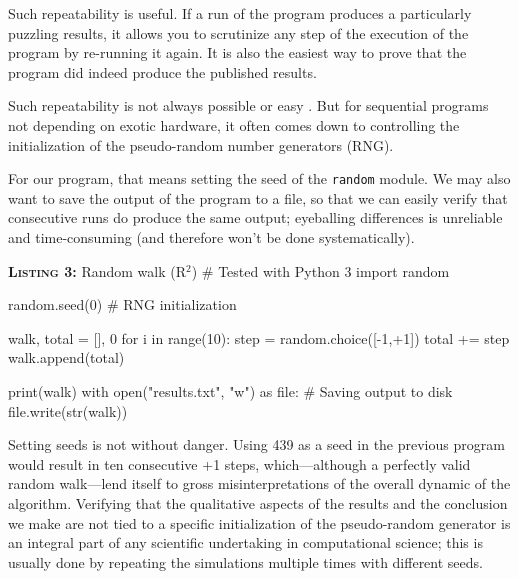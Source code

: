 \documentclass[a4paper,11pt]{article}
\begin{document}
Such repeatability is useful. 
If a run of the program produces a particularly puzzling results, 
it allows you to scrutinize any step of the execution of the program by re-running it again. 
It is also the easiest way to prove that the program did indeed produce the published results.

Such repeatability is not always possible or easy \cite{Diethelm:2012}. But for sequential programs not depending on exotic hardware, it often comes down to controlling the initialization of the pseudo-random number generators (RNG). 

For our program, that means setting the seed of the {\tt random}  module. We may also want to save the output of the program to a file, so that we can easily verify that consecutive runs do produce the same output; eyeballing differences is unreliable and  time-consuming (and therefore won't be done systematically).

\begin{code}{\textbf{\textsc{Listing 3:}} Random walk (R$^2$)}
# Tested with Python 3
import random

random.seed(0) # RNG initialization

walk, total = [], 0
for i in range(10):
    step = random.choice([-1,+1])     
    total += step
    walk.append(total)
    
print(walk)
with open("results.txt", "w") as file: # Saving output to disk
    file.write(str(walk))
\end{code}

Setting seeds is not without danger. 
Using 439 as a seed in the previous program would result in ten consecutive +1 steps, which---although a perfectly valid random walk---lend itself to gross misinterpretations of the overall dynamic of the algorithm. 
Verifying that the qualitative aspects of the results and the conclusion we make are not tied to a specific initialization of the pseudo-random generator is an integral part of any scientific undertaking in computational science; 
this is usually done by repeating the simulations multiple times with different seeds.  


\end{document}
